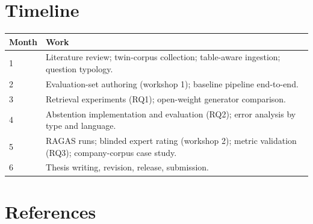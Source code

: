 \documentclass[10pt,a4paper]{article}
\begin{document}
\section{Timeline}

{\small
\begin{tabularx}{\textwidth}{|p{1.6cm}|X|}
\hline
\rowcolor{lightgray} \textbf{Month} & \textbf{Work} \\
\hline
1 & Literature review; twin-corpus collection; table-aware ingestion; question typology. \\
\hline
2 & Evaluation-set authoring (workshop 1); baseline pipeline end-to-end. \\
\hline
3 & Retrieval experiments (RQ1); open-weight generator comparison. \\
\hline
4 & Abstention implementation and evaluation (RQ2); error analysis by type and language. \\
\hline
5 & RAGAS runs; blinded expert rating (workshop 2); metric validation (RQ3); company-corpus case study. \\
\hline
6 & Thesis writing, revision, release, submission. \\
\hline
\end{tabularx}}

\section{References}
\end{document}
